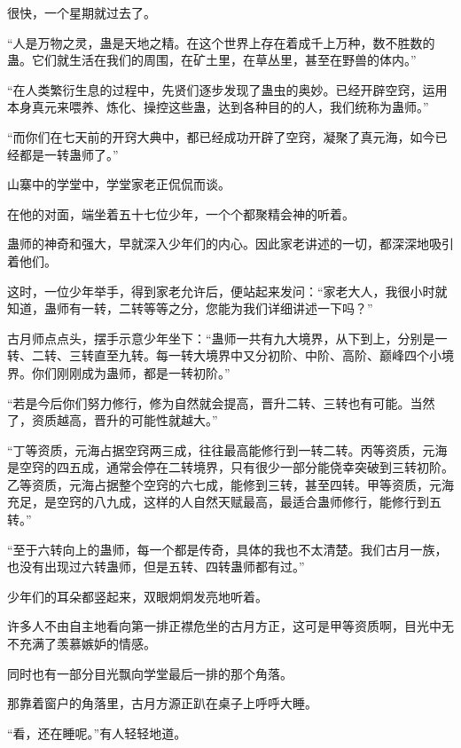 
\begin{this_body}

很快，一个星期就过去了。

“人是万物之灵，蛊是天地之精。在这个世界上存在着成千上万种，数不胜数的蛊。它们就生活在我们的周围，在矿土里，在草丛里，甚至在野兽的体内。”

“在人类繁衍生息的过程中，先贤们逐步发现了蛊虫的奥妙。已经开辟空窍，运用本身真元来喂养、炼化、操控这些蛊，达到各种目的的人，我们统称为蛊师。”

“而你们在七天前的开窍大典中，都已经成功开辟了空窍，凝聚了真元海，如今已经都是一转蛊师了。”

山寨中的学堂中，学堂家老正侃侃而谈。

在他的对面，端坐着五十七位少年，一个个都聚精会神的听着。

蛊师的神奇和强大，早就深入少年们的内心。因此家老讲述的一切，都深深地吸引着他们。

这时，一位少年举手，得到家老允许后，便站起来发问：“家老大人，我很小时就知道，蛊师有一转，二转等等之分，您能为我们详细讲述一下吗？”

古月师点点头，摆手示意少年坐下：“蛊师一共有九大境界，从下到上，分别是一转、二转、三转直至九转。每一转大境界中又分初阶、中阶、高阶、巅峰四个小境界。你们刚刚成为蛊师，都是一转初阶。”

“若是今后你们努力修行，修为自然就会提高，晋升二转、三转也有可能。当然了，资质越高，晋升的可能性就越大。”

“丁等资质，元海占据空窍两三成，往往最高能修行到一转二转。丙等资质，元海是空窍的四五成，通常会停在二转境界，只有很少一部分能侥幸突破到三转初阶。乙等资质，元海占据整个空窍的六七成，能修到三转，甚至四转。甲等资质，元海充足，是空窍的八九成，这样的人自然天赋最高，最适合蛊师修行，能修行到五转。”

“至于六转向上的蛊师，每一个都是传奇，具体的我也不太清楚。我们古月一族，也没有出现过六转蛊师，但是五转、四转蛊师都有过。”

少年们的耳朵都竖起来，双眼炯炯发亮地听着。

许多人不由自主地看向第一排正襟危坐的古月方正，这可是甲等资质啊，目光中无不充满了羡慕嫉妒的情感。

同时也有一部分目光飘向学堂最后一排的那个角落。

那靠着窗户的角落里，古月方源正趴在桌子上呼呼大睡。

“看，还在睡呢。”有人轻轻地道。


\end{this_body}
